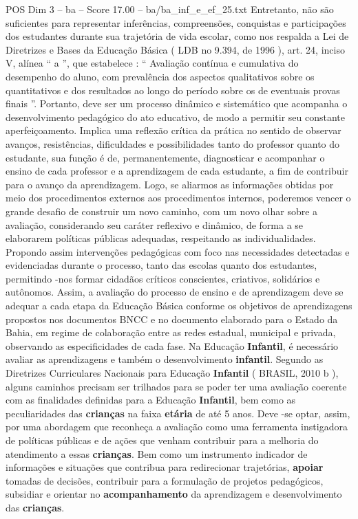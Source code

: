 \begin{textsample}{POS Dim 3 – ba – Score 17.00 – ba/ba\_inf\_e\_ef\_25.txt}
Entretanto, não são suficientes para representar inferências, compreensões, conquistas e participações dos estudantes durante sua trajetória de vida escolar, como nos respalda a Lei de Diretrizes e Bases da Educação Básica ( LDB no 9.394, de 1996 ), art. 24, inciso V, alínea “ a ”, que estabelece : “ Avaliação contínua e cumulativa do desempenho do aluno, com prevalência dos aspectos qualitativos sobre os quantitativos e dos resultados ao longo do período sobre os de eventuais provas finais ”.
Portanto, deve ser um processo dinâmico e sistemático que acompanha o desenvolvimento pedagógico do ato educativo, de modo a permitir seu constante aperfeiçoamento.
Implica uma reflexão crítica da prática no sentido de observar avanços, resistências, dificuldades e possibilidades tanto do professor quanto do estudante, sua função é de, permanentemente, diagnosticar e acompanhar o ensino de cada professor e a aprendizagem de cada estudante, a fim de contribuir para o avanço da aprendizagem.
Logo, se aliarmos as informações obtidas por meio dos procedimentos externos aos procedimentos internos, poderemos vencer o grande desafio de construir um novo caminho, com um novo olhar sobre a avaliação, considerando seu caráter reflexivo e dinâmico, de forma a se elaborarem políticas públicas adequadas, respeitando as individualidades.
Propondo assim intervenções pedagógicas com foco nas necessidades detectadas e evidenciadas durante o processo, tanto das escolas quanto dos estudantes, permitindo -nos formar cidadãos críticos conscientes, criativos, solidários e autônomos.
Assim, a avaliação do processo de ensino e de aprendizagem deve se adequar a cada etapa da Educação Básica conforme os objetivos de aprendizagens propostos nos documentos BNCC e no documento elaborado para o Estado da Bahia, em regime de colaboração entre as redes estadual, municipal e privada, observando as especificidades de cada fase.
Na Educação \textbf{Infantil}, é necessário avaliar as aprendizagens e também o desenvolvimento \textbf{infantil}.
Segundo as Diretrizes Curriculares Nacionais para Educação \textbf{Infantil} ( BRASIL, 2010 b ), alguns caminhos precisam ser trilhados para se poder ter uma avaliação coerente com as finalidades definidas para a Educação \textbf{Infantil}, bem como as peculiaridades das \textbf{crianças} na faixa \textbf{etária} de até 5 anos.
Deve -se optar, assim, por uma abordagem que reconheça a avaliação como uma ferramenta instigadora de políticas públicas e de ações que venham contribuir para a melhoria do atendimento a essas \textbf{crianças}.
Bem como um instrumento indicador de informações e situações que contribua para redirecionar trajetórias, \textbf{apoiar} tomadas de decisões, contribuir para a formulação de projetos pedagógicos, subsidiar e orientar no \textbf{acompanhamento} da aprendizagem e desenvolvimento das \textbf{crianças}.

\end{textsample}
